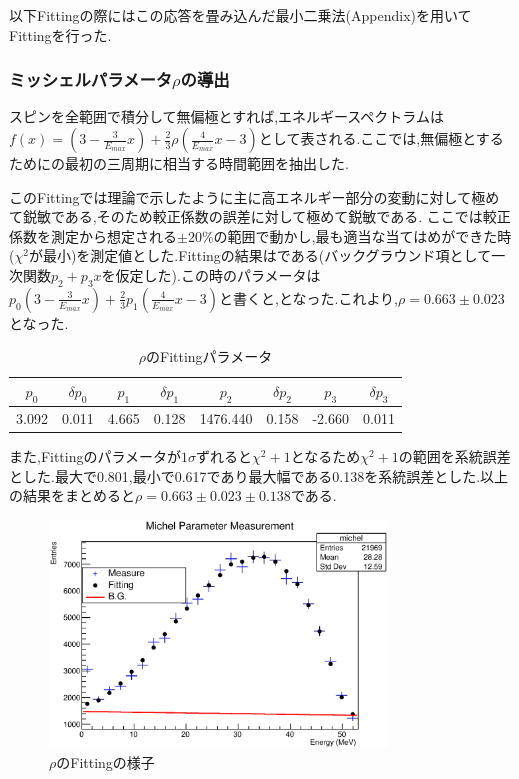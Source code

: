 以下Fittingの際にはこの応答を畳み込んだ最小二乗法(Appendix)を用いてFittingを行った.

\subsubsection{ミッシェルパラメータ$\rho$の導出}
スピンを全範囲で積分して無偏極とすれば,エネルギースペクトラムは$f(x)=(3-\frac{3}{E_{max}}x)+\frac{2}{3}\rho(\frac{4}{E_{max}}x-3)$として表される.ここでは,無偏極とするためにの最初の三周期に相当する時間範囲を抽出した.

このFittingでは理論で示したように主に高エネルギー部分の変動に対して極めて鋭敏である,そのため較正係数の誤差に対して極めて鋭敏である.
ここでは較正係数を測定から想定される$\pm20\%$の範囲で動かし,最も適当な当てはめができた時($\chi^2$が最小)を測定値とした.Fittingの結果はである(バックグラウンド項として一次関数$p_2+p_3x$を仮定した).この時のパラメータは$p_0(3-\frac{3}{E_{max}}x)+\frac{2}{3}p_1(\frac{4}{E_{max}}x-3)$と書くと,となった.これより,$\rho=0.663 \pm 0.023$となった.
\begin{table}[bht]
  \centering
  \caption{$\rho$のFittingパラメータ}
  \begin{tabular}{cccccccc}
    $p_0$ & $\delta p_0$ & $p_1$ & $\delta p_1$ & $p_2$ & $\delta p_2$ & $p_3$ & $\delta p_3$ \\ \hline
    3.092 & 0.011 & 4.665 & 0.128 & 1476.440 & 0.158 & -2.660 & 0.011
  \end{tabular}
  \label{hatano_tab:rho}
\end{table}

また,Fittingのパラメータが$1\sigma$ずれると$\chi^2+1$となるため$\chi^2+1$の範囲を系統誤差とした.最大で0.801,最小で0.617であり最大幅である0.138を系統誤差とした.以上の結果をまとめると$\rho=0.663\pm0.023\pm0.138$である.

\begin{figure}[bht]
  \centering
  \includegraphics[width=0.8\textwidth]{figure/hatano/rho.eps}
  \caption{$\rho$のFittingの様子}
  \label{hatano_fig:rho}
\end{figure}


